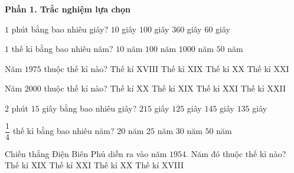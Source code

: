 \textbf{Phần 1. Trắc nghiệm lựa chọn}

\begin{ex} %
$1$ phút bằng bao nhiêu giây?
\choice
{$10$ giây}
{$100$ giây}
{$360$ giây}
{\True $60$ giây}
\end{ex}

\begin{ex} %
$1$ thế kỉ bằng bao nhiêu năm?
\choice
{$10$ năm}
{\True $100$ năm}
{$1000$ năm}
{$50$ năm}
\end{ex}

\begin{ex} %
Năm $1975$ thuộc thế kỉ nào?
\choice
{Thế kỉ XVIII}
{Thế kỉ XIX}
{\True Thế kỉ XX}
{Thế kỉ XXI}
\end{ex}

\begin{ex} %
Năm $2000$ thuộc thế kỉ nào?
\choice
{\True Thế kỉ XX}
{Thế kỉ XIX}
{Thế kỉ XXI}
{Thế kỉ XXII}
\end{ex}

\begin{ex} %
$2$ phút $15$ giây bằng bao nhiêu giây?
\choice
{$215$ giây}
{$125$ giây}
{$145$ giây}
{\True $135$ giây}
\end{ex}

\begin{ex} %
$\dfrac{1}{4}$ thế kỉ bằng bao nhiêu năm?
\choice
{$20$ năm}
{\True $25$ năm}
{$30$ năm}
{$50$ năm}
\end{ex}

\begin{ex} %
Chiến thắng Điện Biên Phủ diễn ra vào năm $1954$. Năm đó thuộc thế kỉ nào?
\choice
{Thế kỉ XIX}
{Thế kỉ XXI}
{\True Thế kỉ XX}
{Thế kỉ XVIII}
\end{ex}

